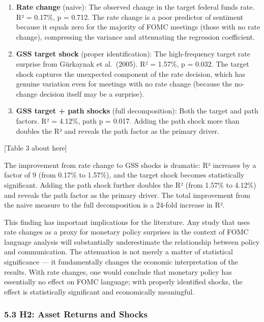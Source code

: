 \documentclass[
]{article}
\begin{document}
\begin{enumerate}
\def\labelenumi{\arabic{enumi}.}
\item
  \textbf{Rate change} (naive): The observed change in the target
  federal funds rate. R² = 0.17\%, p = 0.712. The rate change is a poor
  predictor of sentiment because it equals zero for the majority of FOMC
  meetings (those with no rate change), compressing the variance and
  attenuating the regression coefficient.
\item
  \textbf{GSS target shock} (proper identification): The high-frequency
  target rate surprise from Gürkaynak et al.~(2005). R² = 1.57\%, p =
  0.032. The target shock captures the unexpected component of the rate
  decision, which has genuine variation even for meetings with no rate
  change (because the no-change decision itself may be a surprise).
\item
  \textbf{GSS target + path shocks} (full decomposition): Both the
  target and path factors. R² = 4.12\%, path p = 0.017. Adding the path
  shock more than doubles the R² and reveals the path factor as the
  primary driver.
\end{enumerate}

{[}Table 3 about here{]}

The improvement from rate change to GSS shocks is dramatic: R² increases
by a factor of 9 (from 0.17\% to 1.57\%), and the target shock becomes
statistically significant. Adding the path shock further doubles the R²
(from 1.57\% to 4.12\%) and reveals the path factor as the primary
driver. The total improvement from the naive measure to the full
decomposition is a 24-fold increase in R².

This finding has important implications for the literature. Any study
that uses rate changes as a proxy for monetary policy surprises in the
context of FOMC language analysis will substantially underestimate the
relationship between policy and communication. The attenuation is not
merely a matter of statistical significance --- it fundamentally changes
the economic interpretation of the results. With rate changes, one would
conclude that monetary policy has essentially no effect on FOMC
language; with properly identified shocks, the effect is statistically
significant and economically meaningful.

\subsubsection{5.3 H2: Asset Returns and
Shocks}\label{h2-asset-returns-and-shocks}
\end{document}
